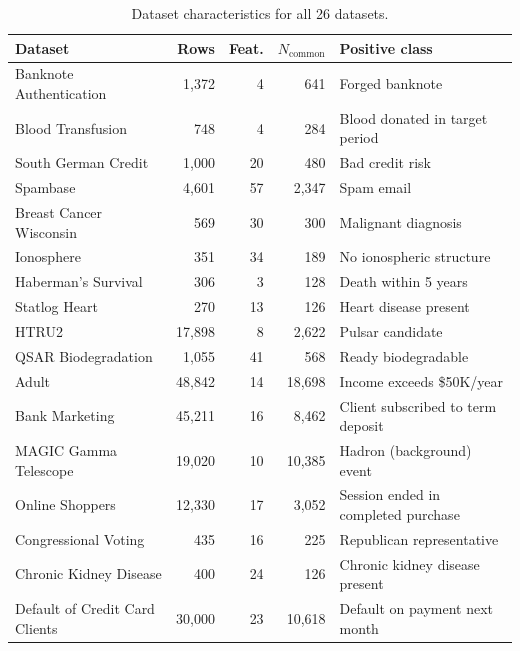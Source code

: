 \begin{table}[t]
\centering
\caption{Dataset characteristics for all 26 datasets.}
\label{tab:datasets}
\begin{tabular}{@{}lrrrl@{}}
\toprule
Dataset & Rows & Feat. & $N_{\text{common}}$ & Positive class \\
\midrule
Banknote Authentication\cite{lohweg2012banknote} & 1{,}372 & 4  & 641   & Forged banknote \\
Blood Transfusion\cite{yeh2008bloodtransfusion} & 748    & 4  & 284   & Blood donated in target period \\
South German Credit\cite{groemping2019germancredit} & 1{,}000 & 20 & 480   & Bad credit risk \\
Spambase\cite{hopkins1999spambase} & 4{,}601 & 57 & 2{,}347 & Spam email \\
Breast Cancer Wisconsin\cite{wolberg1993breastcancer} & 569    & 30 & 300   & Malignant diagnosis \\
Ionosphere\cite{sigillito1989ionosphere} & 351    & 34 & 189   & No ionospheric structure \\
Haberman's Survival\cite{haberman1999survival} & 306    & 3  & 128   & Death within 5 years \\
Statlog Heart\cite{statlogheart} & 270    & 13 & 126   & Heart disease present \\
HTRU2\cite{lyon2015htru2} & 17{,}898 & 8 & 2{,}622 & Pulsar candidate \\
QSAR Biodegradation\cite{mansouri2013qsar} & 1{,}055 & 41 & 568   & Ready biodegradable \\
Adult\cite{becker1996adult} & 48{,}842 & 14 & 18{,}698 & Income exceeds \$50K/year \\
Bank Marketing\cite{moro2014bankmarketing} & 45{,}211 & 16 & 8{,}462  & Client subscribed to term deposit \\
MAGIC Gamma Telescope\cite{bock2004magic} & 19{,}020 & 10 & 10{,}385 & Hadron (background) event \\
Online Shoppers\cite{sakar2018onlineshoppers} & 12{,}330 & 17 & 3{,}052  & Session ended in completed purchase \\
Congressional Voting\cite{uci1987congressionalvoting} & 435     & 16 & 225    & Republican representative \\
Chronic Kidney Disease\cite{rubini2015ckd} & 400     & 24 & 126    & Chronic kidney disease present \\
Default of Credit Card Clients\cite{yeh2009creditcard} & 30{,}000 & 23 & 10{,}618 & Default on payment next month \\

\end{tabular}
\end{table}

